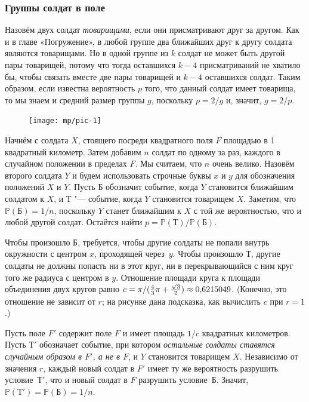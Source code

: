 \documentclass[twoside]{book}
\begin{document}
\subsubsection*{Группы солдат в поле}

Назовём двух солдат \emph{товарищами}, если они присматривают друг за
другом.
Как и в главе «Погружение», в любой группе два ближайших друг
к другу солдата являются товарищами.
Но в одной группе
из $k$ солдат не может быть другой пары товарищей, потому что тогда
оставшихся $k-4$ присматриваний не хватило бы, чтобы связать вместе
две пары товарищей и $k-4$ оставшихся солдат.
Таким образом, если
известна вероятность $p$ того, что данный солдат имеет товарища, то мы
знаем и средний размер группы $g$, поскольку $p = 2/g$ и, значит, $g =
2/p$.

\begin{figure}[!ht]
\centering
\texttt{[image: mp/pic-1]} %
\end{figure}

Начнём с солдата $X$, стоящего посреди квадратного поля $F$ площадью в
1 квадратный километр.
Затем добавим $n$ солдат по одному за раз,
каждого в случайном положении в пределах $F$.
Мы считаем, что $n$
очень велико.
Назовём второго солдата $Y$ и будем использовать
строчные буквы $x$ и $y$ для обозначения положений $X$ и $Y$.
Пусть
$\text{Б}$ обозначит событие, когда $Y$ становится ближайшим солдатом
к $X$, и $\text{Т}$ "--- событие, когда $Y$ становится товарищем $X$.
Заметим, что $\mathbb{P}(\text{Б})=1/n$, поскольку $Y$ станет
ближайшим к $X$ с той же вероятностью, что и любой другой солдат.
Остаётся найти $p=\mathbb{P}(\text{Т})/\mathbb{P}(\text{Б})$.

Чтобы произошло $\text{Б}$, требуется, чтобы другие солдаты не попали
внутрь окружности с центром $x$, проходящей через~$y$.
Чтобы
произошло $\text{Т}$, другие солдаты не должны попасть ни в этот круг,
ни в перекрывающийся с ним круг того же радиуса с центром в $y$.
Отношение площади круга к площади объединения двух кругов равно
$c=\pi/(\tfrac43\pi+\tfrac{\smash{\sqrt{3}}}{2}) \approx 0{,}6215049$.
(Конечно, это отношение не зависит от $r$; на рисунке дана подсказка,
как вычислить $c$ при $r=1$.)

Пусть поле $F'$ содержит поле $F$ и имеет площадь $1/c$ квадратных
километров.
Пусть $\text{Т}'$ обозначает событие, при котором
\emph{остальные солдаты ставятся случайным образом в $F'$, а не в $F$}, и $Y$ становится товарищем $X$.
Независимо от значения $r$,
каждый новый солдат в $F'$ имеет ту же вероятность разрушить
условие~$\text{Т}'$, что и новый солдат в $F$ разрушить
условие~$\text{Б}$.
Значит, $\mathbb{P}(\text{Т}')=
\mathbb{P}(\text{Б}) = 1/n$.
\end{document}
